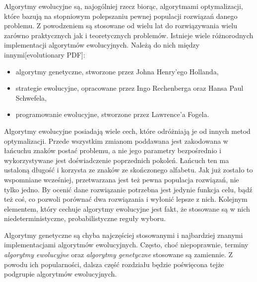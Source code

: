 Algorytmy ewolucyjne są, najogólniej rzecz biorąc, algorytmami optymalizacji, które bazują na stopniowym polepszaniu pewnej populacji rozwiązań danego problemu. Z powodzeniem są stosowane od wielu lat do rozwiązywania wielu zarówno praktycznych jak i teoretycznych problemów. Istnieje wiele różnorodnych implementacji algorytmów ewolucyjnych. Należą do nich między innymi[evolutionary PDF]:
\begin{itemize}
\item algorytmy genetyczne, stworzone przez Johna Henry'ego Hollanda,
\item strategie ewolucyjne, opracowane przez Ingo Rechenberga oraz Hansa Paul Schwefela,
\item programowanie ewolucyjne, stworzone przez Lawrence'a Fogela.
\end{itemize}

Algorytmy ewolucyjne posiadają wiele cech, które odróżniają je od innych metod optymalizacji. Przede wszystkim zmianom poddawana jest zakodowana w łańcuchu znaków postać problemu, a nie jego parametry bezpośrednio i wykorzystywane jest doświadczenie poprzednich pokoleń. Łańcuch ten ma ustaloną długość i korzysta ze znaków ze skończonego alfabetu. Jak już zostało to wspomniane wcześniej, przetwarzana jest też pewna populacja rozwiązań, nie tylko jedno. By ocenić dane rozwiązanie potrzebna jest jedynie funkcja celu, bądź też coś, co pozwoli porównać dwa rozwiązania i wyłonić lepsze z nich. Kolejnym elementem, który cechuje algorytmy ewolucyjne jest fakt, że stosowane są w nich niedeterministyczne, probabilistyczne reguły wyboru.

Algorytmy genetyczne są chyba najczęściej stosowanymi i najbardziej znanymi implementacjami algorytmów ewolucyjnych. Często, choć niepoprawnie, terminy \textit{algorytmy ewolucyjne} oraz \textit{algorytmy genetyczne} stosowane są zamiennie. Z powodu ich popularności, dalsza część rozdziału będzie poświęcona tejże podgrupie algorytmów ewolucyjnych.

